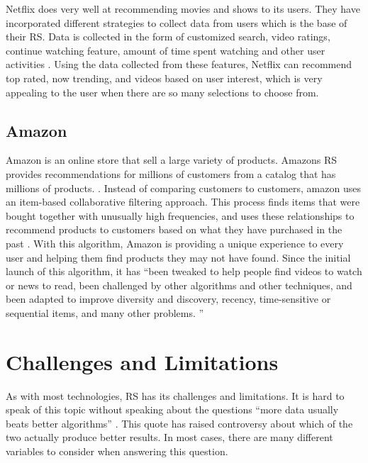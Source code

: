 \documentclass[sigconf]{acmart}
\begin{document}
Netflix does very well at recommending movies and shows to its users. They have incorporated different
strategies to collect data from users which is the base of their RS. Data is collected in the form of
customized search, video ratings, continue watching feature, amount of time spent watching and other user
activities \cite{Gomez-Uribe2015}. Using the data collected from these features, Netflix can recommend top
rated, now trending, and videos based on user interest, which is very appealing to the user when there are so
many selections to choose from.

\subsection{Amazon}
Amazon is an online store that sell a large variety of products. Amazons RS provides recommendations for
millions of customers from a catalog that has millions of products. \cite{Smith2017}. Instead of comparing
customers to customers, amazon uses an item-based collaborative filtering approach. This process finds items
that were bought together with unusually high frequencies, and uses these relationships to recommend products
to customers based on what they have purchased in the past \cite{Smith2017}. With this algorithm, Amazon is
providing a unique experience to every user and helping them find products they may not have found. Since the
initial launch of this algorithm, it has ``been tweaked to help people find videos to watch or news to read,
been challenged by other algorithms and other techniques, and been adapted to improve diversity and discovery,
recency, time-sensitive or sequential items, and many other problems. '' \cite{Smith2017}

\section{Challenges and Limitations}
As with most technologies, RS has its challenges and limitations. It is hard to speak of this topic without
speaking about the questions ``more data usually beats better algorithms'' \cite{Rajaraman2008}. This quote has
raised controversy about which of the two actually produce better results. In most cases, there are many
different variables to consider when answering this question. 
\end{document}
